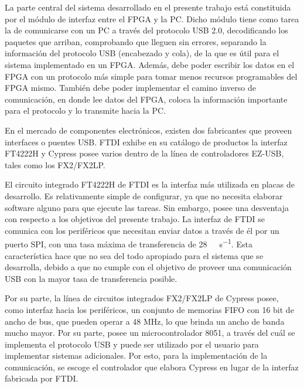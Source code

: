 La parte central del sistema desarrollado en el presente trabajo está constituida por el módulo de interfaz entre el FPGA y la PC. Dicho módulo tiene como tarea la de comunicarse con un PC a través del protocolo USB 2.0, decodificando los paquetes que arriban, comprobando que lleguen sin errores, separando la información del protocolo USB (encabezado y cola), de la que es útil para el sistema implementado en un FPGA. Además, debe poder escribir los datos en el FPGA con un protocolo más simple para tomar menos recursos programables del FPGA mismo. También debe poder implementar el camino inverso de comunicación, en donde lee datos del FPGA, coloca la información importante para el protocolo y lo transmite hacia la PC.%

En el mercado de componentes electrónicos, existen dos fabricantes que proveen interfaces o puentes USB. FTDI exhibe en su catálogo de productos la interfaz FT4222H y Cypress posee varios dentro de la línea de controladores EZ-USB, tales como los FX2/FX2LP.

El circuito integrado FT4222H de FTDI es la interfaz más utilizada en placas de desarrollo. Es relativamente simple de configurar, ya que no necesita elaborar software alguno para que ejecute las tareas. Sin embargo, posee una desventaja con respecto a los objetivos del presente trabajo. La interfaz de FTDI se comunica con los periféricos que necesitan enviar datos a través de él por un puerto SPI, con una tasa máxima de transferencia de \SI{28}{\mega\bit\per\second}. Esta característica hace que no sea del todo apropiado para el sistema que se desarrolla, debido a que no cumple con el objetivo de proveer una comunicación USB con la mayor tasa de transferencia posible.

Por su parte, la línea de circuitos integrados FX2/FX2LP de Cypress posee, como interfaz hacia los periféricos, un conjunto de memorias FIFO con 16 bit de ancho de bus, que pueden operar a 48 MHz, lo que brinda un ancho de banda mucho mayor. Por su parte, posee un microcontrolador 8051, a través del cuál se implementa el protocolo USB y puede ser utilizado por el usuario para implementar sistemas adicionales. Por esto, para la implementación de la comunicación, se escoge el controlador que elabora Cypress en lugar de la interfaz fabricada por FTDI.

